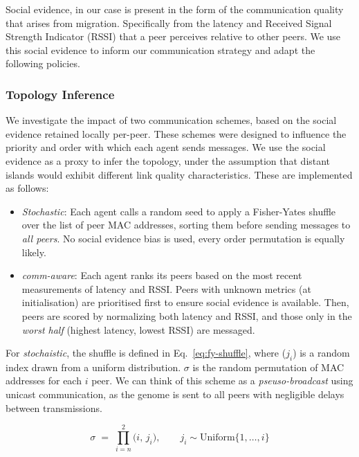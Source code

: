\documentclass[conference]{IEEEtran}
\begin{document}
Social evidence, in our case is present in the form of the communication quality that arises from migration. Specifically from the latency and Received Signal Strength Indicator (RSSI) that a peer perceives relative to other peers. We use this social evidence to inform our communication strategy and adapt the following policies. \\

\subsubsection{Topology Inference}\label{sec:topology-inference}

We investigate the impact of two communication schemes, based on the social evidence retained locally per-peer. These schemes were designed to influence the priority and order with which each agent sends messages. We use the social evidence as a proxy to infer the topology, under the assumption that distant islands would exhibit different link quality characteristics. These are implemented as follows:

\begin{itemize}
    \item \emph{Stochastic}: Each agent calls a random seed to apply a Fisher-Yates shuffle \cite{fisher_statistical_1963} over the list of peer MAC addresses, sorting them before sending messages to \emph{all peers}. No social evidence bias is used, every order permutation is equally likely.
    \item \emph{comm-aware}: Each agent ranks its peers based on the most recent measurements of latency and RSSI. Peers with unknown metrics (at initialisation) are prioritised first to ensure social evidence is available. Then, peers are scored by normalizing both latency and RSSI, and those only in the \emph{worst half} (highest latency, lowest RSSI) are messaged.
\end{itemize}

For \emph{stochaistic}, the shuffle is defined in Eq.~\ref{eq:fy-shuffle}, where ($j_i$) is a random index drawn from a uniform distribution. $\sigma$ is the random permutation of MAC addresses for each $i$ peer. We can think of this scheme as a \emph{pseuso-broadcast} using unicast communication, as the genome is sent to all peers with negligible delays between transmissions.

\begin{equation}\label{eq:fy-shuffle}
\sigma \;=\; \prod_{i=n}^{2} \bigl(i,\, j_i\bigr), 
\qquad j_i \sim \mathrm{Uniform}\{1,\dots,i\}
\end{equation}
\end{document}
